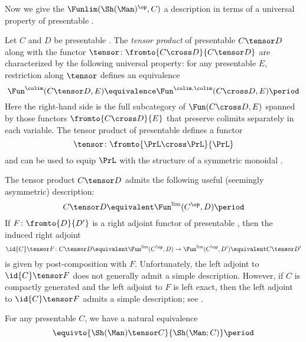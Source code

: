 Now we give the \category $ \Funlim(\Sh(\Man)^{\op},C) $ a description in terms of a universal property of presentable \categories.

\begin{recollection}[{\HA{Proposition}{4.8.1.17}}]
	Let $ C $ and $ D $ be presentable \categories.
	The \textit{tensor product} of presentable \categories $ C \tensor D $ along with the functor $ \tensor \colon \fromto{C \cross D}{C \tensor D} $ are characterized by the following universal property: for any presentable \category $ E $, restriction along $ \tensor $ defines an equivalence 
	\begin{equation*}
		\Fun^{\colim}(C \tensor D,E) \equivalence \Fun^{\colim,\colim}(C \cross D,E) \period
	\end{equation*}
	Here the right-hand side is the full subcategory of $ \Fun(C \cross D,E) $ spanned by those functors $ \fromto{C \cross D}{E} $ that preserve colimits separately in each variable.
	The tensor product of presentable \categories defines a functor
	\begin{equation*}
		\tensor \colon \fromto{\PrL \cross \PrL}{\PrL}
	\end{equation*}
	and can be used to equip $ \PrL $ with the structure of a symmetric monoidal \category.

	The tensor product $ C \tensor D $ admits the following useful (seemingly asymmetric) description:
	\begin{equation*}
		C \tensor D \equivalent \Fun^{\lim}(C^{\op},D) \period
	\end{equation*}
	If $ F \colon \fromto{D}{D'} $ is a right adjoint functor of presentable \categories, then the induced right adjoint
	\begin{equation*}
		\id{C} \tensor F \colon C \tensor D \equivalent \Fun^{\lim}(C^{\op},D) \to \Fun^{\lim}(C^{\op},D') \equivalent C \tensor D'
	\end{equation*}
	is given by post-composition with $ F $.
	Unfortunately, the left adjoint to $ \id{C} \tensor F $ does not generally admit a simple description.
	However, if $ C $ is compactly generated and the left adjoint to $ F $ is left exact, then the left adjoint to $ \id{C} \tensor F $ admits a simple description; see \cite[\S2.2]{arXiv:2108.03545}.
\end{recollection}

\begin{example}
	For any presentable \category $ C $, we have a natural equivalence
	\begin{equation*}
		\equivto{\Sh(\Man) \tensor C}{\Sh(\Man;C)} \period
	\end{equation*}
\end{example}
	
